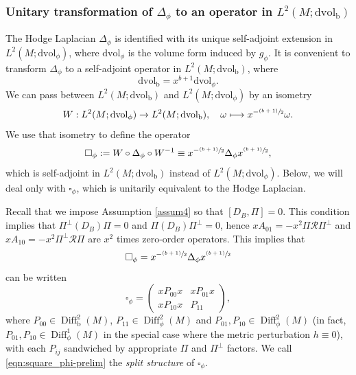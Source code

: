 \documentclass[11pt]{article}
\numberwithin{equation}{section}
\newcommand\mto{\mathchoice{\longmapsto}{\mapsto}{\mapsto}{\mapsto}}
\newcommand{\psfrac}[2]{\sfrac{(#1)}{#2}}
\theoremstyle{plain}
\theoremstyle{definition}
\newcommand{\bb}{{\mathrm{b}}}
\newcommand{\dvol}{\mathrm{dvol}}
\DeclareMathOperator{\Diff}{Diff}
\begin{document}
\subsubsection{Unitary transformation of $\Delta_\phi$ to an operator in $L^2(M; \dvol_\bb)$}

The Hodge Laplacian $\Delta_{\phi}$ is identified with its unique self-adjoint extension in
$L^2(M; \dvol_\phi)$, where $\dvol_\phi$ is the volume form induced by $g_\phi$.
It is convenient to transform $\Delta_{\phi}$
to a self-adjoint operator in $L^2(M; \dvol_\bb)$,
where
\begin{equation}\label{dvb}
\dvol_\bb = x^{b+1} \dvol_\phi.
\end{equation}
We can pass between $L^2(M; \dvol_\bb)$ and $L^2(M; \dvol_\phi)$ by an isometry
\begin{equation}\label{T}
W: L^2(M; \dvol_\phi) \to L^2(M; \dvol_\bb), \quad \omega \mto x^{-\psfrac{b+1}{2}} \omega.
\end{equation}
We use that isometry to define the operator
\begin{equation*}
\square_\phi := W \circ \Delta_{\phi} \circ W^{-1} \equiv x^{-\psfrac{b+1}{2}} \Delta_{\phi} x^{\psfrac{b+1}{2}},
\end{equation*}
which is self-adjoint in $L^2(M; \dvol_\bb)$ instead of $L^2(M; \dvol_\phi)$.
Below, we will deal only with $\square_\phi$, which is unitarily equivalent to the
Hodge Laplacian.

Recall that we impose Assumption \ref{assum4} so that $[D_B, \Pi] = 0$.
This condition implies that $\Pi^{\bot}\left(D_{B}\right)\Pi = 0$ and $\Pi\left(D_{B}\right)\Pi^{\bot} = 0$, hence $xA_{01}=-x^2 \Pi
\mathscr{R}\Pi^\perp$ and $xA_{10}=-x^2\Pi^\perp\mathscr{R}\Pi$ are $x^2$ times zero-order operators.
This implies that
\[
\square_{\phi} = x^{-\psfrac{b+1}{2}} \Delta_{\phi}x^{\psfrac{b+1}{2}}
\]
can be written
\begin{equation}
\label{eqn:square_phi-prelim}
\square_\phi =
\begin{pmatrix}
xP_{00}x & xP_{01}x \\
xP_{10}x & P_{11}
\end{pmatrix},
\end{equation}
where $P_{00}\in\Diff^2_\bb(M)$, $P_{11}\in \Diff^2_\phi(M)$
and $P_{01}, P_{10}\in \Diff^2_\phi(M)$ (in fact, $P_{01}, P_{10}\in \Diff^1_\phi(M)$ in the special case where the metric perturbation
$h\equiv 0$),
with each $P_{ij}$ sandwiched by appropriate $\Pi$ and $\Pi^\perp$ factors.
We call \eqref{eqn:square_phi-prelim} the \textit{split structure} of $\square_\phi$.
\end{document}
